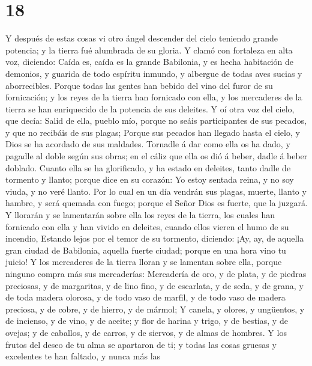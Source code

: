 \hypertarget{section-17}{%
\section{18}\label{section-17}}

 Y después de estas cosas vi otro ángel descender del cielo
teniendo grande potencia; y la tierra fué alumbrada de su gloria.
 Y clamó con fortaleza en alta voz, diciendo: Caída es,
caída es la grande Babilonia, y es hecha habitación de demonios, y
guarida de todo espíritu inmundo, y albergue de todas aves sucias y
aborrecibles.  Porque todas las gentes han bebido del vino
del furor de su fornicación; y los reyes de la tierra han fornicado con
ella, y los mercaderes de la tierra se han enriquecido de la potencia de
sus deleites.  Y oí otra voz del cielo, que decía: Salid de
ella, pueblo mío, porque no seáis participantes de sus pecados, y que no
recibáis de sus plagas;  Porque sus pecados han llegado
hasta el cielo, y Dios se ha acordado de sus maldades. 
Tornadle á dar como ella os ha dado, y pagadle al doble según sus obras;
en el cáliz que ella os dió á beber, dadle á beber doblado. 
Cuanto ella se ha glorificado, y ha estado en deleites, tanto dadle de
tormento y llanto; porque dice en su corazón: Yo estoy sentada reina, y
no soy viuda, y no veré llanto.  Por lo cual en un día
vendrán sus plagas, muerte, llanto y hambre, y será quemada con fuego;
porque el Señor Dios es fuerte, que la juzgará.  Y llorarán
y se lamentarán sobre ella los reyes de la tierra, los cuales han
fornicado con ella y han vivido en deleites, cuando ellos vieren el humo
de su incendio,  Estando lejos por el temor de su tormento,
diciendo: ¡Ay, ay, de aquella gran ciudad de Babilonia, aquella fuerte
ciudad; porque en una hora vino tu juicio!  Y los
mercaderes de la tierra lloran y se lamentan sobre ella, porque ninguno
compra más sus mercaderías:  Mercadería de oro, y de plata,
y de piedras preciosas, y de margaritas, y de lino fino, y de escarlata,
y de seda, y de grana, y de toda madera olorosa, y de todo vaso de
marfil, y de todo vaso de madera preciosa, y de cobre, y de hierro, y de
mármol;  Y canela, y olores, y ungüentos, y de incienso, y
de vino, y de aceite; y flor de harina y trigo, y de bestias, y de
ovejas; y de caballos, y de carros, y de siervos, y de almas de hombres.
 Y los frutos del deseo de tu alma se apartaron de ti; y
todas las cosas gruesas y excelentes te han faltado, y nunca más las
